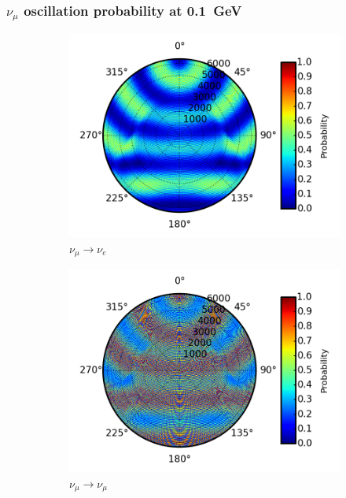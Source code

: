 \documentclass{beamer}
\begin{document}
\begin{frame}
	\frametitle{$\nu_{\mu}$ oscillation probability at \SI{0.1}{GeV}}
	\begin{figure}
		\centering
		\begin{subfigure}[b]{0.33\linewidth}
			\caption{ $\nu_{\mu} \rightarrow \nu_{e}$ }
			\includegraphics[width=\linewidth]{earth_0.1gev_numu2nue_throughEarth.png}
		\end{subfigure}
		\begin{subfigure}[b]{0.33\linewidth}
			\caption{ $\nu_{\mu} \rightarrow \nu_{\mu}$ }
			\includegraphics[width=\linewidth]{earth_0.1gev_numu2numu_throughEarth.png}
		\end{subfigure}
		\begin{subfigure}[b]{0.33\linewidth}

\end{subfigure}
\end{figure}
\end{frame}
\end{document}
